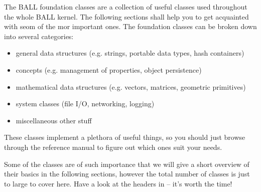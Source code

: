 \label{section:kernel-data-structures}
The BALL foundation classes are a collection of useful classes used throughout
the whole BALL kernel. The following sections shall help you to get acquainted
with seom of the mor important ones. The foundation classes can be broken down
into several categories:
\begin{itemize}
	\item general data structures (e.g. strings, portable data types, hash
			containers)
	\item concepts (e.g. management of properties, object persistence)
	\item mathematical data structures (e.g. vectors, matrices, geometric
				primitives)
	\item system classes (file I/O, networking, logging)
	\item miscellaneous other stuff
\end{itemize}
These classes implement a plethora of useful things, so you should just browse
through the reference manual to figure out which ones suit your needs. 

Some of the classes are of such importance that we will give a short overview
of their basics in the following sections, however the total number of classes
is just to large to cover here. Have a look at the headers in 
 -- it's
worth the time!
